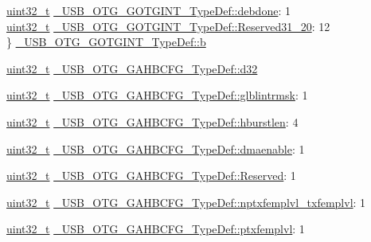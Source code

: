 \begin{DoxyCompactItemize}
\begin{tabbing}
\>\hyperlink{stdint_8h_a435d1572bf3f880d55459d9805097f62}{uint32\_t} \hyperlink{group___u_s_b___o_t_g___d_r_i_v_e_r_gab634dbc7a75e92711261edb16b3c3d7d}{\_USB\_OTG\_GOTGINT\_TypeDef::debdone}: 1\\
\>\hyperlink{stdint_8h_a435d1572bf3f880d55459d9805097f62}{uint32\_t} \hyperlink{group___u_s_b___o_t_g___d_r_i_v_e_r_gab48b8fbd939a2b311335643ef6020ab7}{\_USB\_OTG\_GOTGINT\_TypeDef::Reserved31\_20}: 12\\
\} \hyperlink{group___u_s_b___o_t_g___d_r_i_v_e_r_ga4fa69adf57a104a19ca77b625595a361}{\_USB\_OTG\_GOTGINT\_TypeDef::b}\\

\end{tabbing}\item 
\hyperlink{stdint_8h_a435d1572bf3f880d55459d9805097f62}{uint32\-\_\-t} \hyperlink{group___u_s_b___o_t_g___d_r_i_v_e_r_ga30dd79fdb9e4a7f5cb48555928b8fbe3}{\-\_\-\-U\-S\-B\-\_\-\-O\-T\-G\-\_\-\-G\-A\-H\-B\-C\-F\-G\-\_\-\-Type\-Def\-::d32}
\item 
\hyperlink{stdint_8h_a435d1572bf3f880d55459d9805097f62}{uint32\-\_\-t} \hyperlink{group___u_s_b___o_t_g___d_r_i_v_e_r_ga6d5b18dc5c45a9377ff26ae705e237f0}{\-\_\-\-U\-S\-B\-\_\-\-O\-T\-G\-\_\-\-G\-A\-H\-B\-C\-F\-G\-\_\-\-Type\-Def\-::glblintrmsk}\-: 1
\item 
\hyperlink{stdint_8h_a435d1572bf3f880d55459d9805097f62}{uint32\-\_\-t} \hyperlink{group___u_s_b___o_t_g___d_r_i_v_e_r_gaef76ba04426956f90a8f6f25dd493051}{\-\_\-\-U\-S\-B\-\_\-\-O\-T\-G\-\_\-\-G\-A\-H\-B\-C\-F\-G\-\_\-\-Type\-Def\-::hburstlen}\-: 4
\item 
\hyperlink{stdint_8h_a435d1572bf3f880d55459d9805097f62}{uint32\-\_\-t} \hyperlink{group___u_s_b___o_t_g___d_r_i_v_e_r_gaa752eec03f809fffd6f0f46f34b5752d}{\-\_\-\-U\-S\-B\-\_\-\-O\-T\-G\-\_\-\-G\-A\-H\-B\-C\-F\-G\-\_\-\-Type\-Def\-::dmaenable}\-: 1
\item 
\hyperlink{stdint_8h_a435d1572bf3f880d55459d9805097f62}{uint32\-\_\-t} \hyperlink{group___u_s_b___o_t_g___d_r_i_v_e_r_ga44156423025612e25b7e6c0f473b5a50}{\-\_\-\-U\-S\-B\-\_\-\-O\-T\-G\-\_\-\-G\-A\-H\-B\-C\-F\-G\-\_\-\-Type\-Def\-::\-Reserved}\-: 1
\item 
\hyperlink{stdint_8h_a435d1572bf3f880d55459d9805097f62}{uint32\-\_\-t} \hyperlink{group___u_s_b___o_t_g___d_r_i_v_e_r_gae2801f85844ee69bae3fcb3a2e9d201e}{\-\_\-\-U\-S\-B\-\_\-\-O\-T\-G\-\_\-\-G\-A\-H\-B\-C\-F\-G\-\_\-\-Type\-Def\-::nptxfemplvl\-\_\-txfemplvl}\-: 1
\item 
\hyperlink{stdint_8h_a435d1572bf3f880d55459d9805097f62}{uint32\-\_\-t} \hyperlink{group___u_s_b___o_t_g___d_r_i_v_e_r_ga8aef75b0d6a052f8e4e305e99f9dca16}{\-\_\-\-U\-S\-B\-\_\-\-O\-T\-G\-\_\-\-G\-A\-H\-B\-C\-F\-G\-\_\-\-Type\-Def\-::ptxfemplvl}\-: 1

\end{DoxyCompactItemize}
